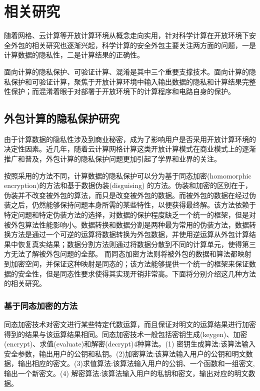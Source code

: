 \chapter{相关研究}
随着网格、云计算等开放计算环境从概念走向实用，针对科学计算在开放环境下安全外包的相关研究也逐渐兴起，科学计算的安全外包主要关注两方面的问题，一是计算数据的隐私性，二是计算结果的正确性。

面向计算的隐私保护、可验证计算、混淆是其中三个重要支撑技术。面向计算的隐私保护和可验证计算，聚焦于开放计算环境中输入输出数据的隐私和计算结果完整性保护；而混淆着眼于对部署于开放环境下的计算程序和电路自身的保护。

\label{chap:2}
\section{外包计算的隐私保护研究}
由于计算数据的隐私性涉及到商业秘密，成为了影响用户是否采用开放计算环境的决定性因素。近几年，随着云计算网格计算这类开放计算模式在商业模式上的逐渐推广和普及，外包计算的隐私保护问题更加引起了学界和业界的关注。

按照采用的方法不同，计算数据的隐私保护可以分为基于同态加密(homomorphic encryption)的方法和基于数据伪装(disguising) 的方法。伪装和加密的区别在于，伪装并不改变被外包的算法，而只是改变被外包的数据。而被外包的数据在经过伪装之后，仍然能够保持问题本身所需的某些特性，以便获得最终解。该方法依赖于特定问题和特定伪装方法的选择，对数据的保护程度缺乏一个统一的框架，但是对被外包算法性能影响小。数据转换和数据分割是两种最为常用的伪装方法，数据转换方法是通过一个可逆的运算将数据转换为外包数据，并使用逆运算从外包计算结果中恢复真实结果；数据分割方法则通过将数据分散到不同的计算单元，使得第三方无法了解被外包问题的全部。
而同态加密方法则将被外包的数据和算法都映射到加密空间，并保证这种映射是同态的；该方法能够提供一个统一的框架来保证数据的安全性，但是同态性要求使得其实现开销非常高。下面将分别介绍这几种方法的相关研究。

\subsection{基于同态加密的方法}
同态加密技术对密文进行某些特定代数运算，而且保证对明文的运算结果进行加密得到的结果与该运算结果相同。同态加密技术一般包括密钥生成(keygen)、加密(encrypt)、求值(evaluate)和解密(decrypt)4种算法。(1) 密钥生成算法:该算法输入安全参数，输出用户的公钥和私钥。(2)加密算法:该算法输入用户的公钥和明文数据，输出相应的密文。(3)求值算法:该算法输入用户的公钥、一个函数和一组密文,输出一个新密文。(4) 解密算法:该算法输入用户的私钥和密文，输出对应的明文数据。

